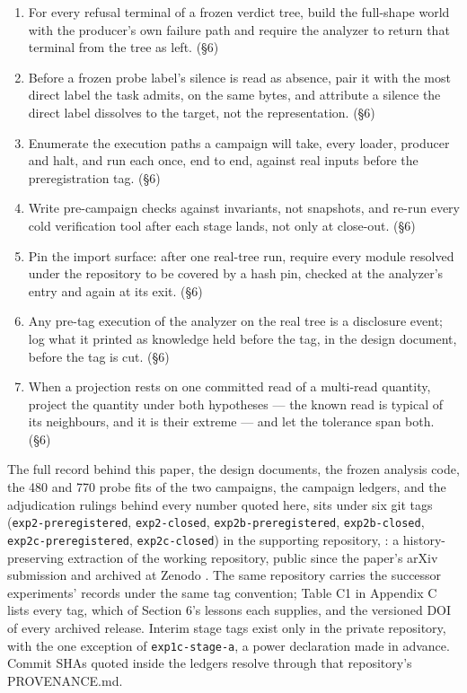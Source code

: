 \begin{enumerate}
  (§6)
\item
  For every refusal terminal of a frozen verdict tree, build the
  full-shape world with the producer's own failure path and require
  the analyzer to return that terminal from the tree as left. (§6)
\item
  Before a frozen probe label's silence is read as absence, pair it
  with the most direct label the task admits, on the same bytes, and
  attribute a silence the direct label dissolves to the target, not
  the representation. (§6)
\item
  Enumerate the execution paths a campaign will take, every loader,
  producer and halt, and run each once, end to end, against real
  inputs before the preregistration tag. (§6)
\item
  Write pre-campaign checks against invariants, not snapshots, and
  re-run every cold verification tool after each stage lands, not
  only at close-out. (§6)
\item
  Pin the import surface: after one real-tree run, require every
  module resolved under the repository to be covered by a hash pin,
  checked at the analyzer's entry and again at its exit. (§6)
\item
  Any pre-tag execution of the analyzer on the real tree is a
  disclosure event; log what it printed as knowledge held before the
  tag, in the design document, before the tag is cut. (§6)
\item
  When a projection rests on one committed read of a multi-read
  quantity, project the quantity under both hypotheses — the known
  read is typical of its neighbours, and it is their extreme — and let
  the tolerance span both. (§6)
\end{enumerate}

The full record behind this paper, the design documents, the frozen
analysis code, the 480 and 770 probe fits of the two campaigns, the
campaign ledgers, and the adjudication rulings behind every number
quoted here, sits under six git tags (\texttt{exp2-preregistered},
\texttt{exp2-closed}, \texttt{exp2b-preregistered}, \texttt{exp2b-closed},
\texttt{exp2c-preregistered}, \texttt{exp2c-closed}) in the supporting repository, \repourl{}: a
history-preserving
extraction of the working repository, public since the paper's arXiv
submission and archived at Zenodo \zenodospan{}. The same repository carries the successor experiments'
records under the same tag convention; Table C1 in Appendix C lists
every tag, which of Section 6's lessons each supplies, and the
versioned DOI of every archived release. Interim stage tags exist only
in the private repository, with the one exception of \texttt{exp1c-stage-a},
a power declaration made in advance. Commit SHAs quoted inside the
ledgers resolve through that repository's PROVENANCE.md.

